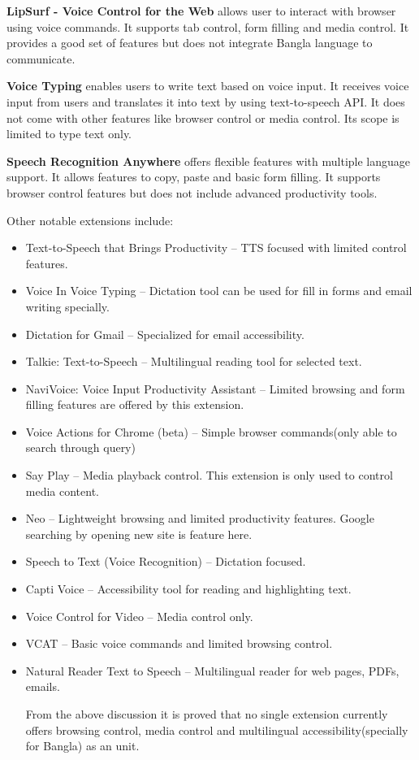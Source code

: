 	\textbf{LipSurf - Voice Control for the Web\cite{lipsurf}} allows user to interact with browser using voice commands. It supports tab control, form filling and media control. It provides a good set of features but does not integrate Bangla language to communicate.
    
	\textbf{Voice Typing\cite{voicetyping}} enables users to write text based on voice input. It receives voice input from users and translates it into text by using text-to-speech API. It does not come with other features like browser control or media control. Its scope is limited to type text only.
	
	\textbf{Speech Recognition Anywhere\cite{speechrec}} offers flexible features with multiple language support. It allows features to copy, paste and basic form filling. It supports browser control features but does not include advanced productivity tools. 
	
	Other notable extensions include: 
	\begin{itemize}
		\item	Text-to-Speech that Brings Productivity\cite{texttospeechprod} – TTS focused with limited control features.
		\item	Voice In Voice Typing\cite{voicein} – Dictation tool can be used for fill in forms and email writing specially.
		\item	Dictation for Gmail\cite{dictationgmail} – Specialized for email accessibility. 
		\item	Talkie: Text-to-Speech\cite{talkie} – Multilingual reading tool for selected text.
		\item	NaviVoice: Voice Input Productivity Assistant\cite{navivoice} – Limited browsing and form filling features are offered by this extension.
		\item	Voice Actions for Chrome (beta)\cite{voiceactions} – Simple browser commands(only able to search through query)
		\item	Say Play\cite{sayplay} – Media playback control. This extension is only used to control media content.
		\item	Neo\cite{neo} – Lightweight browsing and limited productivity features. Google searching by opening new site is feature here.
		\item	Speech to Text (Voice Recognition)\cite{speechtext} – Dictation focused.
		\item	Capti Voice\cite{captivoice} – Accessibility tool for reading and highlighting text.
		\item	Voice Control for Video\cite{voicecontrolvideo} – Media control only.
		\item	VCAT\cite{vcat} – Basic voice commands and limited browsing control.
		\item	Natural Reader Text to Speech\cite{naturalreader} – Multilingual reader for web pages, PDFs, emails.
		
        From the above discussion it is proved that no single extension currently offers browsing control, media control and multilingual accessibility(specially for Bangla) as an unit.
		
	\end{itemize}
